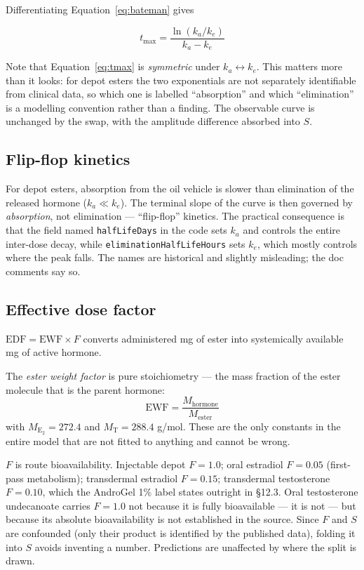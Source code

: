 \documentclass[11pt,a4paper]{article}
\newcommand{\code}[1]{\texttt{\small #1}}
\begin{document}
Differentiating Equation~\ref{eq:bateman} gives

\begin{equation}
t_{\max} = \frac{\ln(k_a/k_e)}{k_a - k_e}
\label{eq:tmax}
\end{equation}

Note that Equation~\ref{eq:tmax} is \emph{symmetric} under $k_a \leftrightarrow
k_e$. This matters more than it looks: for depot esters the two exponentials are
not separately identifiable from clinical data, so which one is labelled
``absorption'' and which ``elimination'' is a modelling convention rather than a
finding. The observable curve is unchanged by the swap, with the amplitude
difference absorbed into $S$.

\subsection{Flip-flop kinetics}

For depot esters, absorption from the oil vehicle is slower than elimination of
the released hormone ($k_a \ll k_e$). The terminal slope of the curve is then
governed by \emph{absorption}, not elimination --- ``flip-flop'' kinetics. The
practical consequence is that the field named \code{halfLifeDays} in the code sets
$k_a$ and controls the entire inter-dose decay, while
\code{eliminationHalfLifeHours} sets $k_e$, which mostly controls where the peak
falls. The names are historical and slightly misleading; the doc comments say so.

\subsection{Effective dose factor}
\label{sec:edf}

$\mathrm{EDF} = \mathrm{EWF} \times F$ converts administered mg of ester into
systemically available mg of active hormone.

The \emph{ester weight factor} is pure stoichiometry --- the mass fraction of the
ester molecule that is the parent hormone:
\[
\mathrm{EWF} = \frac{M_{\text{hormone}}}{M_{\text{ester}}}
\]
with $M_{\mathrm{E}_2} = 272.4$ and $M_{\mathrm{T}} = 288.4$ g/mol. These are the
only constants in the entire model that are not fitted to anything and cannot be
wrong.

$F$ is route bioavailability. Injectable depot $F = 1.0$; oral estradiol
$F = 0.05$ (first-pass metabolism); transdermal estradiol $F = 0.15$; transdermal
testosterone $F = 0.10$, which the AndroGel 1\% label states outright in
\S12.3. Oral testosterone undecanoate carries $F = 1.0$ not because it is fully
bioavailable --- it is not --- but because its absolute bioavailability is not
established in the source. Since $F$ and $S$ are confounded (only their product is
identified by the published data), folding it into $S$ avoids inventing a number.
Predictions are unaffected by where the split is drawn.
\end{document}

